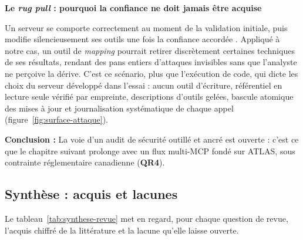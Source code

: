 \begin{encadre}
\textbf{Le \emph{rug pull} : pourquoi la confiance ne doit jamais être acquise}

Un serveur se comporte correctement au moment de la validation initiale, puis modifie silencieusement ses outils une fois la confiance accordée \cite{hou}. Appliqué à notre cas, un outil de \emph{mapping} pourrait retirer discrètement certaines techniques de ses résultats, rendant des pans entiers d'attaques invisibles sans que l'analyste ne perçoive la dérive. C'est ce scénario, plus que l'exécution de code, qui dicte les choix du serveur développé dans l'essai : aucun outil d'écriture, référentiel en lecture seule vérifié par empreinte, descriptions d'outils gelées, bascule atomique des mises à jour et journalisation systématique de chaque appel (figure~\ref{fig:surface-attaque}).
\end{encadre}

\begin{encadre}
\textbf{Conclusion :} La voie d'un audit de sécurité outillé et ancré est ouverte : c'est ce que le chapitre suivant prolonge avec un flux multi-MCP fondé sur ATLAS, sous contrainte réglementaire canadienne (\textbf{QR4}).
\end{encadre}

\subsection{Synthèse : acquis et lacunes}\label{sec:synthese-revue}

Le tableau~\ref{tab:synthese-revue} met en regard, pour chaque question de revue, l'acquis chiffré de la littérature et la lacune qu'elle laisse ouverte.


